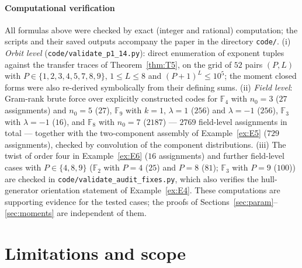 \documentclass[10pt,journal,draftclsnofoot,onecolumn]{IEEEtran}
\theoremstyle{definition}
\theoremstyle{remark}
\begin{document}
\paragraph{Computational verification}
All formulas above were checked by exact (integer and rational)
computation; the scripts and their saved outputs accompany the paper in
the directory \texttt{code/}. (i) \emph{Orbit level}
(\texttt{code/}\allowbreak\texttt{validate\_p1\_14.py}): direct enumeration of exponent
tuples against the transfer traces of Theorem~\ref{thm:T5}, on the grid
of \(52\) pairs \((P,L)\) with \(P \in \{1,2,3,4,5,7,8,9\}\),
\(1 \le L \le 8\) and \((P+1)^L \le 10^5\); the moment closed forms were
also re-derived symbolically from their defining sums. (ii) \emph{Field
level}: Gram-rank brute force over explicitly constructed codes for
\(\mathbb{F}_4\) with \(n_0 = 3\) (\(27\) assignments) and \(n_0 = 5\)
(\(27\)), \(\mathbb{F}_9\) with \(k = 1\), \(\lambda = 1\) (\(256\)) and
\(\lambda = -1\) (\(256\)), \(\mathbb{F}_3\) with \(\lambda = -1\)
(\(16\)), and \(\mathbb{F}_8\) with \(n_0 = 7\) (\(2187\)) ---
\(2769\) field-level assignments in total --- together with the
two-component assembly of Example~\ref{ex:E5} (\(729\) assignments),
checked by convolution of the component distributions. (iii) The twist
of order four in Example~\ref{ex:E6} (\(16\) assignments) and further
field-level cases with \(P \in \{4, 8, 9\}\) (\(\mathbb{F}_2\) with
\(P = 4\) (\(25\)) and \(P = 8\) (\(81\)); \(\mathbb{F}_3\) with
\(P = 9\) (\(100\))) are checked in
\texttt{code/}\allowbreak\texttt{validate\_audit\_fixes.py}, which also verifies the
hull-generator orientation statement of Example~\ref{ex:E4}. These computations are supporting evidence for the
tested cases; the proofs of
Sections~\ref{sec:param}--\ref{sec:moments} are independent of them.

\section{Limitations and scope}\label{sec:limitations}
\end{document}

